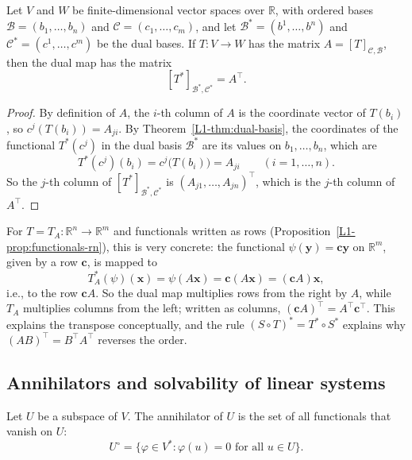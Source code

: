 \begin{theorem}\label{L1-thm:dual-map-matrix}
    Let $V$ and $W$ be finite-dimensional vector spaces over $\mathbb{R}$, with ordered bases $\mathcal{B} = (b_1, \ldots, b_n)$ and $\mathcal{C} = (c_1, \ldots, c_m)$, and let $\mathcal{B}^* = (b^1, \ldots, b^n)$ and $\mathcal{C}^* = (c^1, \ldots, c^m)$ be the dual bases. If $T: V \to W$ has the matrix $A = [T]_{\mathcal{C}, \mathcal{B}}$, then the dual map has the matrix
    \[[T^*]_{\mathcal{B}^*, \mathcal{C}^*} = A^\top.\]
\end{theorem}

\begin{proof}
    By definition of $A$, the $i$-th column of $A$ is the coordinate vector of $T(b_i)$, so $c^j(T(b_i)) = A_{ji}$. By Theorem~\ref{L1-thm:dual-basis}, the coordinates of the functional $T^*(c^j)$ in the dual basis $\mathcal{B}^*$ are its values on $b_1, \ldots, b_n$, which are
    \[T^*(c^j)(b_i) = c^j\big(T(b_i)\big) = A_{ji} \qquad (i = 1, \ldots, n).\]
    So the $j$-th column of $[T^*]_{\mathcal{B}^*, \mathcal{C}^*}$ is $(A_{j1}, \ldots, A_{jn})^\top$, which is the $j$-th column of $A^\top$.
\end{proof}

For $T = T_A: \mathbb{R}^n \to \mathbb{R}^m$ and functionals written as rows (Proposition~\ref{L1-prop:functionals-rn}), this is very concrete: the functional $\psi(\mathbf{y}) = \mathbf{c}\mathbf{y}$ on $\mathbb{R}^m$, given by a row $\mathbf{c}$, is mapped to
\[T_A^*(\psi)(\mathbf{x}) = \psi(A\mathbf{x}) = \mathbf{c}(A\mathbf{x}) = (\mathbf{c}A)\mathbf{x},\]
i.e., to the row $\mathbf{c}A$. So the dual map multiplies rows from the right by $A$, while $T_A$ multiplies columns from the left; written as columns, $(\mathbf{c}A)^\top = A^\top \mathbf{c}^\top$. This explains the transpose conceptually, and the rule $(S \circ T)^* = T^* \circ S^*$ explains why $(AB)^\top = B^\top A^\top$ reverses the order.

\subsection{Annihilators and solvability of linear systems}

\begin{definition}[Annihilator]
    Let $U$ be a subspace of $V$. The annihilator of $U$ is the set of all functionals that vanish on $U$:
    \[U^\circ = \{\varphi \in V^* : \varphi(u) = 0 \text{ for all } u \in U\}.\]
\end{definition}

